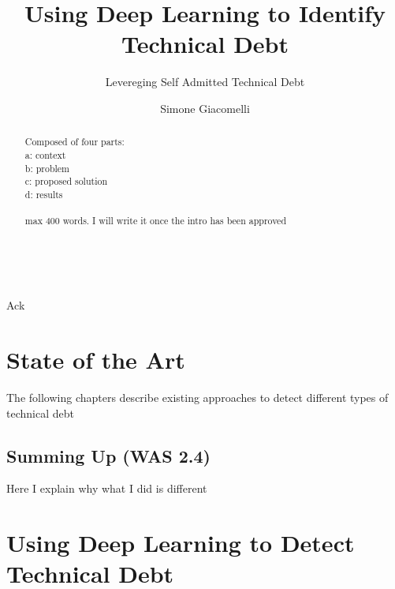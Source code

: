 \documentclass[12pt, mscthesis]{usiinfthesis}
\title{Using Deep Learning to Identify Technical Debt} %
\subtitle{Levereging Self Admitted Technical Debt} %
\author{Simone Giacomelli} %
\begin{document}
\maketitle %

\frontmatter %

\begin{abstract}
Composed of four parts: \\
a: context\\
b: problem\\
c: proposed solution\\
d: results\\
\\
max 400 words.
I will write it once the intro has been approved
\\
\\
\\
\lipsum[1-1]
\end{abstract}



\begin{acknowledgements}
Ack 
\end{acknowledgements}

\tableofcontents 
\listoffigures %
\listoftables %

\mainmatter




\chapter{State of the Art}
The following chapters describe existing approaches to detect different types of technical debt







\section{Summing Up (WAS 2.4)}
Here I explain why what I did is different


\chapter{Using Deep Learning to Detect Technical Debt}
\end{document}
